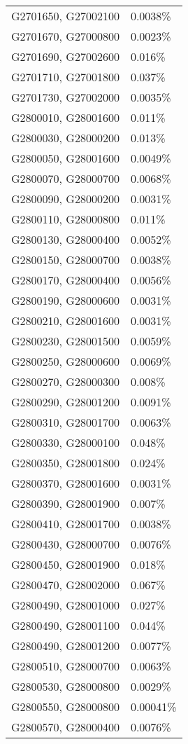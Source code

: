 \begin{longtable}[]{@{}ll@{}}
G2701650, G27002100 & 0.0038\% \\
G2701670, G27000800 & 0.0023\% \\
G2701690, G27002600 & 0.016\% \\
G2701710, G27001800 & 0.037\% \\
G2701730, G27002000 & 0.0035\% \\
G2800010, G28001600 & 0.011\% \\
G2800030, G28000200 & 0.013\% \\
G2800050, G28001600 & 0.0049\% \\
G2800070, G28000700 & 0.0068\% \\
G2800090, G28000200 & 0.0031\% \\
G2800110, G28000800 & 0.011\% \\
G2800130, G28000400 & 0.0052\% \\
G2800150, G28000700 & 0.0038\% \\
G2800170, G28000400 & 0.0056\% \\
G2800190, G28000600 & 0.0031\% \\
G2800210, G28001600 & 0.0031\% \\
G2800230, G28001500 & 0.0059\% \\
G2800250, G28000600 & 0.0069\% \\
G2800270, G28000300 & 0.008\% \\
G2800290, G28001200 & 0.0091\% \\
G2800310, G28001700 & 0.0063\% \\
G2800330, G28000100 & 0.048\% \\
G2800350, G28001800 & 0.024\% \\
G2800370, G28001600 & 0.0031\% \\
G2800390, G28001900 & 0.007\% \\
G2800410, G28001700 & 0.0038\% \\
G2800430, G28000700 & 0.0076\% \\
G2800450, G28001900 & 0.018\% \\
G2800470, G28002000 & 0.067\% \\
G2800490, G28001000 & 0.027\% \\
G2800490, G28001100 & 0.044\% \\
G2800490, G28001200 & 0.0077\% \\
G2800510, G28000700 & 0.0063\% \\
G2800530, G28000800 & 0.0029\% \\
G2800550, G28000800 & 0.00041\% \\
G2800570, G28000400 & 0.0076\% \\

\end{longtable}
